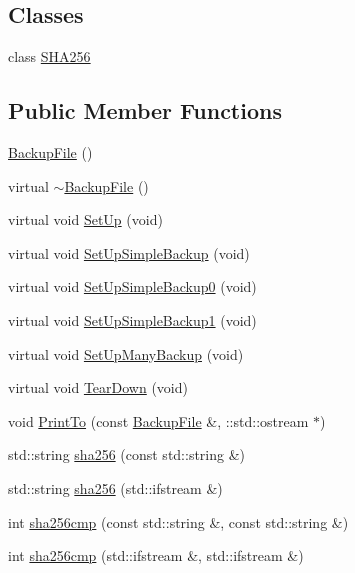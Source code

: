 \subsection*{Classes}
\begin{DoxyCompactItemize}
\item 
class \hyperlink{classclang_1_1tidy_1_1pagesjaunes_1_1test_1_1_backup_file_1_1_s_h_a256}{S\+H\+A256}
\end{DoxyCompactItemize}
\subsection*{Public Member Functions}
\begin{DoxyCompactItemize}
\item 
\hyperlink{classclang_1_1tidy_1_1pagesjaunes_1_1test_1_1_backup_file_a1f42e8a56c0802a2e04f6a93471aa073}{Backup\+File} ()
\item 
virtual \hyperlink{classclang_1_1tidy_1_1pagesjaunes_1_1test_1_1_backup_file_a8d9327a1868f6854635ef7d7f31813af}{$\sim$\+Backup\+File} ()
\item 
virtual void \hyperlink{classclang_1_1tidy_1_1pagesjaunes_1_1test_1_1_backup_file_aad0e95d0c9bad2e2104fb6cb8ec7cacc}{Set\+Up} (void)
\item 
virtual void \hyperlink{classclang_1_1tidy_1_1pagesjaunes_1_1test_1_1_backup_file_aff6562634de2e56533cb1220894c9b90}{Set\+Up\+Simple\+Backup} (void)
\item 
virtual void \hyperlink{classclang_1_1tidy_1_1pagesjaunes_1_1test_1_1_backup_file_a1c3f8ddd2e12ac89a6a2b43bc269f69c}{Set\+Up\+Simple\+Backup0} (void)
\item 
virtual void \hyperlink{classclang_1_1tidy_1_1pagesjaunes_1_1test_1_1_backup_file_a20076e5d45d3df60f6417d6cd7e10f66}{Set\+Up\+Simple\+Backup1} (void)
\item 
virtual void \hyperlink{classclang_1_1tidy_1_1pagesjaunes_1_1test_1_1_backup_file_a88f365e11813a35d63d07fcf832b3c85}{Set\+Up\+Many\+Backup} (void)
\item 
virtual void \hyperlink{classclang_1_1tidy_1_1pagesjaunes_1_1test_1_1_backup_file_a9d2e724d4d88c6c330f9e3e43c5ecab8}{Tear\+Down} (void)
\item 
void \hyperlink{classclang_1_1tidy_1_1pagesjaunes_1_1test_1_1_backup_file_af922febe6734175a205f1572eb289730}{Print\+To} (const \hyperlink{classclang_1_1tidy_1_1pagesjaunes_1_1test_1_1_backup_file}{Backup\+File} \&, \+::std\+::ostream $\ast$)
\item 
std\+::string \hyperlink{classclang_1_1tidy_1_1pagesjaunes_1_1test_1_1_backup_file_a146fa015b7bb79122129c84f4d0ef54f}{sha256} (const std\+::string \&)
\item 
std\+::string \hyperlink{classclang_1_1tidy_1_1pagesjaunes_1_1test_1_1_backup_file_a886904478367718ab3cda84138a64a68}{sha256} (std\+::ifstream \&)
\item 
int \hyperlink{classclang_1_1tidy_1_1pagesjaunes_1_1test_1_1_backup_file_a68a79fc23d88b23608886199fc3b8673}{sha256cmp} (const std\+::string \&, const std\+::string \&)
\item 
int \hyperlink{classclang_1_1tidy_1_1pagesjaunes_1_1test_1_1_backup_file_a62e30ec55b721ae4250ff077a21a780a}{sha256cmp} (std\+::ifstream \&, std\+::ifstream \&)
\end{DoxyCompactItemize}

